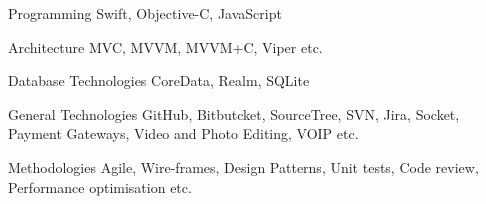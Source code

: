 


\begin{cvskills}


\cvskill
{Programming} %
{Swift, Objective-C, JavaScript} %


\cvskill
{Architecture} %
{MVC, MVVM, MVVM+C, Viper etc.} %


\cvskill
{Database Technologies} %
{CoreData, Realm, SQLite} %


\cvskill
{General Technologies} %
{GitHub, Bitbutcket, SourceTree, SVN, Jira, Socket, Payment Gateways, Video and Photo Editing, VOIP etc.} %


\cvskill
{Methodologies} %
{Agile, Wire-frames, Design Patterns, Unit tests, Code review, Performance optimisation etc.} %


\end{cvskills}